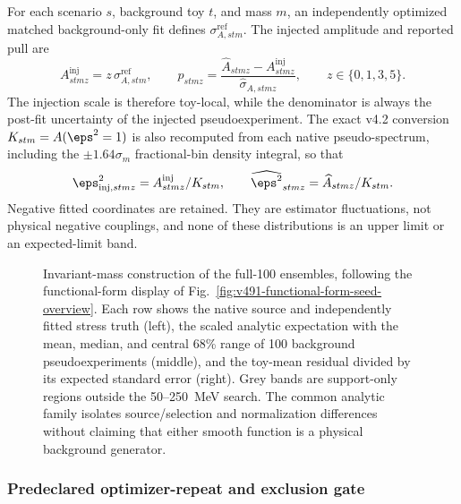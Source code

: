 For each scenario $s$, background toy $t$, and mass $m$, an independently optimized
matched background-only fit defines $\sigma^{\mathrm{ref}}_{A,stm}$.  The injected
amplitude and reported pull are
\begin{equation}
 A^{\mathrm{inj}}_{stmz}=z\,\sigma^{\mathrm{ref}}_{A,stm},
 \qquad
 p_{stmz}=\frac{\widehat A_{stmz}-A^{\mathrm{inj}}_{stmz}}
 {\widehat\sigma_{A,stmz}},
 \qquad z\in\{0,1,3,5\}.
 \label{eq:v501-v4p6-refmatched-pull}
\end{equation}
The injection scale is therefore toy-local, while the denominator is always the
post-fit uncertainty of the injected pseudoexperiment.  The exact v4.2 conversion
$K_{stm}=A(\eps^2=1)$ is also recomputed from each native pseudo-spectrum, including
the $\pm1.64\sigma_m$ fractional-bin density integral, so that
\begin{equation}
 \eps^2_{\mathrm{inj},stmz}=A^{\mathrm{inj}}_{stmz}/K_{stm},
 \qquad
 \widehat{\eps^2}_{stmz}=\widehat A_{stmz}/K_{stm}.
 \label{eq:v501-v4p6-eps2-coordinate}
\end{equation}
Negative fitted coordinates are retained.  They are estimator fluctuations, not
physical negative couplings, and none of these distributions is an upper limit or an
expected-limit band.

\begin{figure}[p]
\centering
{}
\caption{Invariant-mass construction of the full-100 ensembles, following the
functional-form display of Fig.~\ref{fig:v491-functional-form-seed-overview}.  Each row
shows the native source and independently fitted stress truth (left), the scaled
analytic expectation with the mean, median, and central 68\% range of 100 background
pseudoexperiments (middle), and the toy-mean residual divided by its expected standard
error (right).  Grey bands are support-only regions outside the 50--250~MeV search.
The common analytic family isolates source/selection and normalization differences
without claiming that either smooth function is a physical background generator.}
\label{fig:v501-v4p6-functional-form-exposure-distributions}
\end{figure}

\subsubsection{Predeclared optimizer-repeat and exclusion gate}

